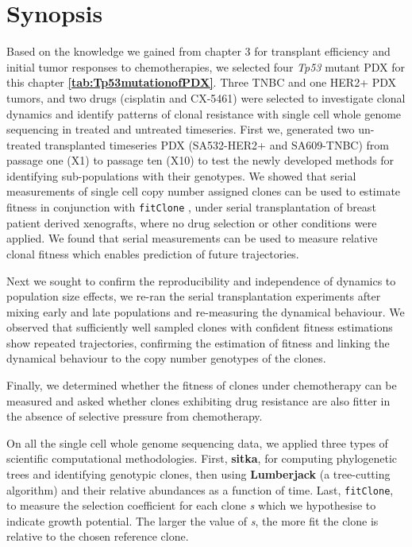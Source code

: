 \section{Synopsis}
Based on the knowledge we gained from chapter 3 for transplant efficiency and initial tumor responses to chemotherapies, we selected four \textit{Tp53} mutant \ac{PDX} for this chapter \textbf{\autoref{tab:Tp53mutationofPDX}}. Three TNBC and one HER2+ \ac{PDX} tumors, and two drugs (cisplatin and CX-5461) were selected to investigate clonal dynamics and identify patterns of clonal resistance with single cell whole genome sequencing in treated and untreated timeseries. First we, generated two un-treated transplanted timeseries PDX (SA532-HER2+ and SA609-TNBC) from passage one (X1) to passage ten (X10) to test the newly developed methods for identifying sub-populations with their genotypes. 
We showed that serial measurements of single cell copy number assigned clones can be used to estimate fitness in conjunction with \texttt{fitClone} \cite{salehi2020single}, under serial transplantation of breast patient derived xenografts, where no drug selection or other conditions were applied. We found that serial measurements can be used to measure relative clonal fitness which enables prediction of future trajectories.

Next we sought to  confirm the reproducibility and independence of dynamics to population size effects, we re-ran the serial transplantation experiments after mixing early and late populations and re-measuring the dynamical behaviour. We observed that sufficiently well sampled clones with confident fitness estimations show repeated trajectories, confirming the estimation of fitness and linking the dynamical behaviour to the copy number genotypes of the clones.

Finally, we determined whether the fitness of clones under chemotherapy can be measured and asked whether clones exhibiting drug resistance are also fitter in the absence of selective pressure from chemotherapy. 

On all the single cell whole genome sequencing data, we applied three types of scientific computational methodologies. First, \textbf{sitka}, for computing phylogenetic trees and identifying genotypic clones, then using \textbf{Lumberjack} (a tree-cutting algorithm) and their relative abundances as a function of time. Last, \texttt{fitClone}, to measure the selection coefficient for each clone \textit{s} which we hypothesise to indicate growth potential. The larger the value of \textit{s}, the more fit the clone is relative to the chosen reference clone. 


